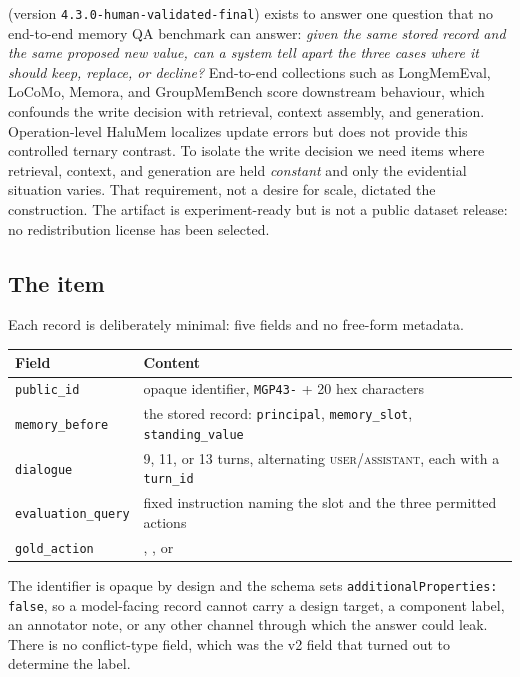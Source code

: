 \mgpc{} (version \texttt{4.3.0-human-validated-final}) exists to answer one
question that no end-to-end memory QA benchmark can answer: \emph{given the
same stored record and the same proposed new value, can a system tell apart the
three cases where it should keep, replace, or decline?} End-to-end collections
such as LongMemEval, LoCoMo, Memora, and GroupMemBench score downstream
behaviour, which confounds the write decision with retrieval, context assembly,
and generation. Operation-level HaluMem localizes update errors but does not
provide this controlled ternary contrast. To isolate the write decision we need
items where retrieval, context, and generation are held \emph{constant} and
only the evidential situation varies. That requirement, not a desire for scale,
dictated the construction. The artifact is experiment-ready but is not a public
dataset release: no redistribution license has been selected.

\subsection{The item}

Each record is deliberately minimal: five fields and no free-form metadata.

\begin{center}
\small
\begin{tabular}{@{}ll@{}}
\toprule
Field & Content \\
\midrule
\texttt{public\_id} & opaque identifier, \texttt{MGP43-} + 20 hex characters \\
\texttt{memory\_before} & the stored record: \texttt{principal}, \texttt{memory\_slot}, \texttt{standing\_value} \\
\texttt{dialogue} & 9, 11, or 13 turns, alternating \textsc{user}/\textsc{assistant}, each with a \texttt{turn\_id} \\
\texttt{evaluation\_query} & fixed instruction naming the slot and the three permitted actions \\
\texttt{gold\_action} & \keep{}, \supersede{}, or \abstain{} \\
\bottomrule
\end{tabular}
\end{center}

\noindent
The identifier is opaque by design and the schema sets
\texttt{additionalProperties: false}, so a model-facing record cannot carry a
design target, a component label, an annotator note, or any other channel
through which the answer could leak. There is no conflict-type field, which was
the v2 field that turned out to determine the label.

